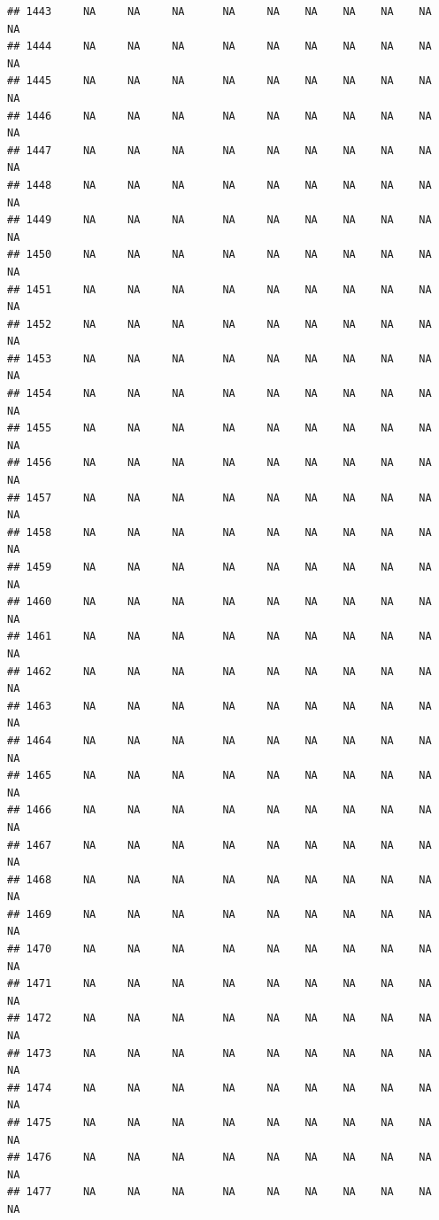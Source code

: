 \documentclass{article}\usepackage{graphicx, color}
\makeatletter
\newenvironment{kframe}{%
 \def\at@end@of@kframe{}%
 \ifinner\ifhmode%
  \def\at@end@of@kframe{\end{minipage}}%
  \begin{minipage}{\columnwidth}%
 \fi\fi%
 \def\FrameCommand##1{\hskip\@totalleftmargin \hskip-\fboxsep
 \colorbox{shadecolor}{##1}\hskip-\fboxsep
     \hskip-\linewidth \hskip-\@totalleftmargin \hskip\columnwidth}%
 \MakeFramed {\advance\hsize-\width
   \@totalleftmargin\z@ \linewidth\hsize
   \@setminipage}}%
 {\par\unskip\endMakeFramed%
 \at@end@of@kframe}
\newenvironment{knitrout}{}{} %
\makeatother
\begin{document}
\begin{knitrout}
\begin{kframe}
\begin{verbatim}
## 1443     NA     NA     NA      NA     NA    NA    NA    NA    NA     NA
## 1444     NA     NA     NA      NA     NA    NA    NA    NA    NA     NA
## 1445     NA     NA     NA      NA     NA    NA    NA    NA    NA     NA
## 1446     NA     NA     NA      NA     NA    NA    NA    NA    NA     NA
## 1447     NA     NA     NA      NA     NA    NA    NA    NA    NA     NA
## 1448     NA     NA     NA      NA     NA    NA    NA    NA    NA     NA
## 1449     NA     NA     NA      NA     NA    NA    NA    NA    NA     NA
## 1450     NA     NA     NA      NA     NA    NA    NA    NA    NA     NA
## 1451     NA     NA     NA      NA     NA    NA    NA    NA    NA     NA
## 1452     NA     NA     NA      NA     NA    NA    NA    NA    NA     NA
## 1453     NA     NA     NA      NA     NA    NA    NA    NA    NA     NA
## 1454     NA     NA     NA      NA     NA    NA    NA    NA    NA     NA
## 1455     NA     NA     NA      NA     NA    NA    NA    NA    NA     NA
## 1456     NA     NA     NA      NA     NA    NA    NA    NA    NA     NA
## 1457     NA     NA     NA      NA     NA    NA    NA    NA    NA     NA
## 1458     NA     NA     NA      NA     NA    NA    NA    NA    NA     NA
## 1459     NA     NA     NA      NA     NA    NA    NA    NA    NA     NA
## 1460     NA     NA     NA      NA     NA    NA    NA    NA    NA     NA
## 1461     NA     NA     NA      NA     NA    NA    NA    NA    NA     NA
## 1462     NA     NA     NA      NA     NA    NA    NA    NA    NA     NA
## 1463     NA     NA     NA      NA     NA    NA    NA    NA    NA     NA
## 1464     NA     NA     NA      NA     NA    NA    NA    NA    NA     NA
## 1465     NA     NA     NA      NA     NA    NA    NA    NA    NA     NA
## 1466     NA     NA     NA      NA     NA    NA    NA    NA    NA     NA
## 1467     NA     NA     NA      NA     NA    NA    NA    NA    NA     NA
## 1468     NA     NA     NA      NA     NA    NA    NA    NA    NA     NA
## 1469     NA     NA     NA      NA     NA    NA    NA    NA    NA     NA
## 1470     NA     NA     NA      NA     NA    NA    NA    NA    NA     NA
## 1471     NA     NA     NA      NA     NA    NA    NA    NA    NA     NA
## 1472     NA     NA     NA      NA     NA    NA    NA    NA    NA     NA
## 1473     NA     NA     NA      NA     NA    NA    NA    NA    NA     NA
## 1474     NA     NA     NA      NA     NA    NA    NA    NA    NA     NA
## 1475     NA     NA     NA      NA     NA    NA    NA    NA    NA     NA
## 1476     NA     NA     NA      NA     NA    NA    NA    NA    NA     NA
## 1477     NA     NA     NA      NA     NA    NA    NA    NA    NA     NA

\end{verbatim}
\end{kframe}
\end{knitrout}
\end{document}
